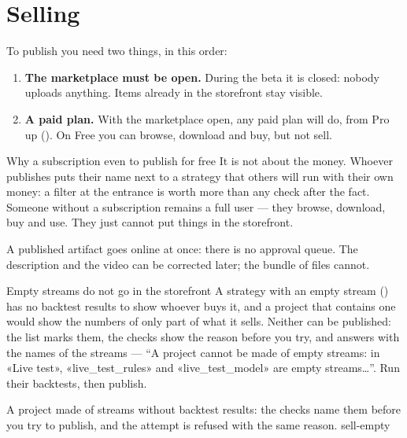 \section{Selling}\label{sez:sell}

To publish you need two things, in this order:

\begin{enumerate}
  \item \textbf{The marketplace must be open.} During the beta it is closed:
        nobody uploads anything. Items already in the storefront stay
        visible.
  \item \textbf{A paid plan.} With the marketplace open, any paid plan will
        do, from Pro up (). On Free you can browse, download
        and buy, but not sell.
\end{enumerate}

\begin{perche}{Why a subscription even to publish for free}
It is not about the money. Whoever publishes puts their name next to a
strategy that others will run with their own money: a filter at the entrance
is worth more than any check after the fact. Someone without a subscription
remains a full user --- they browse, download, buy and use. They just cannot
put things in the storefront.
\end{perche}

\noindent
A published artifact goes online at once: there is no approval queue. The
description and the video can be corrected later; the bundle of files
cannot.

\begin{attenzione}{Empty streams do not go in the storefront}
A strategy with an empty stream () has no backtest results
to show whoever buys it, and a project that contains one would show the
numbers of only part of what it sells. Neither can be published: the list
marks them, the checks show the reason before you try, and
 answers with the names of the streams --- \enquote{A project
cannot be made of empty streams: in «Live test», «live\_test\_rules» and
«live\_test\_model» are empty streams\ldots}. Run their backtests, then publish.
\end{attenzione}

  {A project made of streams without backtest results: the checks name them
   before you try to publish, and the attempt is refused with the same
   reason.}
  {sell-empty}

